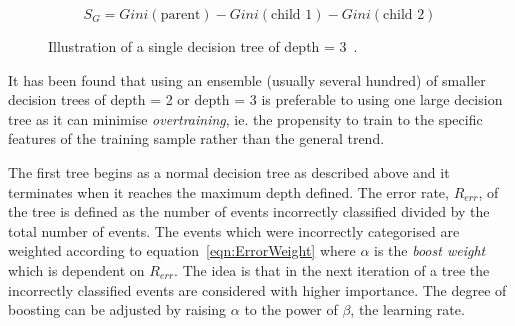 

\begin{equation}
S_{G} = Gini(\textrm{parent}) - Gini(\textrm{child 1}) - Gini(\textrm{child 2})
\label{eqn:SepGain}
\end{equation}

\begin{figure}[h!]
\begin{center}
\hspace{0.2cm}
\end{center}
\caption{Illustration of a single decision tree of depth = 3~\cite{2007physics3039H}.}
\label{fig:DecisionTree}
\end{figure} 

It has been found that using an ensemble (usually several hundred) of smaller decision trees of depth = 2 or depth = 3 is preferable to using one large decision tree as it can minimise \emph{overtraining}, ie. the propensity to train to the specific features of the training sample rather than the general trend. 

The first tree begins as a normal decision tree as described above and it terminates when it reaches the maximum depth defined. The error rate, $R_{err}$, of the tree is defined as the number of events incorrectly classified divided by the total number of events. The events which were incorrectly categorised are weighted according to equation~\ref{eqn:ErrorWeight} where $\alpha$ is the \emph{boost weight} which is dependent on $R_{err}$. The idea is that in the next iteration of a tree the incorrectly classified events are considered with higher importance. The degree of boosting can be adjusted by raising $\alpha$ to the power of $\beta$, the learning rate.

